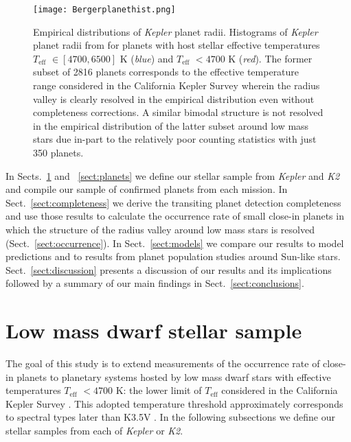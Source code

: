 \documentclass[twocolumn]{emulateapj}
\newcommand{\kepler}[1]{\emph{Kepler}#1}
\newcommand{\ktwo}[1]{\emph{K2}#1}
\newcommand{\teff}[1]{$T_{\text{eff}}$#1}
\begin{document}
\begin{figure}
  \centering
  \texttt{[image: Bergerplanethist.png]}
  \caption{Empirical distributions of \kepler{} planet radii. Histograms of \kepler{} planet radii
    from \cite{berger18} for planets with host stellar effective temperatures \teff{} $\in [4700,6500]$ K
    (\emph{blue}) and \teff{} $<4700$ K (\emph{red}). The former subset of 2816 planets corresponds to the
    effective temperature range considered in the California Kepler Survey \citep{fulton17}
    wherein the radius valley is clearly
    resolved in the empirical distribution even without completeness corrections. A similar bimodal
    structure is not resolved in the empirical distribution of the latter subset around low mass stars
    due in-part to the relatively poor counting statistics with just 350 planets.}
  \label{fig:berger}
\end{figure}


In Sects.~\ref{sect:stars} and ~\ref{sect:planets} we define our stellar sample from \kepler{} and \ktwo{}
and compile our sample of confirmed planets from each mission.
In Sect.~\ref{sect:completeness} we derive the transiting planet detection completeness and use those results
to calculate the occurrence rate of small close-in planets in which the structure of the radius valley around
low mass stars is resolved (Sect.~\ref{sect:occurrence}). In Sect.~\ref{sect:models} we compare our results to
model predictions and to results from planet population studies around Sun-like stars. 
Sect.~\ref{sect:discussion} presents a discussion of our results
and its implications followed by a summary of our main findings in Sect.~\ref{sect:conclusions}.


\section{Low mass dwarf stellar sample} \label{sect:stars}
The goal of this study is to extend measurements of the occurrence rate of close-in planets to planetary systems hosted
by low mass dwarf stars with effective temperatures \teff{} $<4700$ K: the lower limit of \teff{}
considered in the California Kepler Survey \citep[CKS;][]{fulton17}.
This adopted temperature threshold approximately corresponds to spectral types later than
K3.5V \citep{pecaut13}. In the following subsections we define our stellar samples from each of \kepler{} or \ktwo{.}
\end{document}
